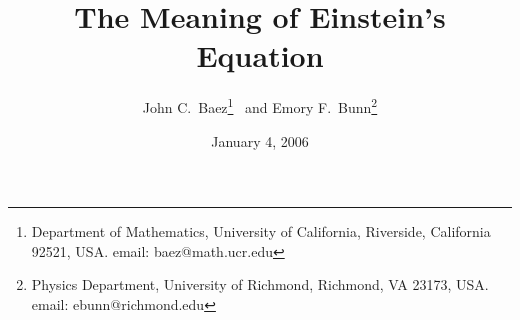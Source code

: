  

\hfuzz=6pt

\newcommand{\et}{\hspace{-0.08in}{\bf .}\hspace{0.1in}}
\newcommand{\BOX}{\hbox {$\sqcap$ \kern -1em $\sqcup$}}
\newcommand{\qed}{\hskip 3em \hbox{\BOX} \vskip 2ex}

\newenvironment{alphalist}{
\begin{list}{{\normalshape(\alph{letter})}}{\usecounter{letter}}
}{\end{list}}

%
%
%
\documentclass[12pt] {article} 
\usepackage {amsfonts}

\usepackage[colorlinks=true
,breaklinks=true
,urlcolor=blue
,anchorcolor=blue
,citecolor=blue
,filecolor=blue
,linkcolor=blue
,menucolor=blue
,linktocpage=true]{hyperref}
\hypersetup{
bookmarksopen=true,
bookmarksnumbered=true,
bookmarksopenlevel=10
}
\usepackage[utf8]{inputenc}
\usepackage[T1]{fontenc}
\usepackage[largesc]{newpxtext}
\usepackage[smallerops]{newpxmath}
\usepackage[cal=cm]{mathalfa}
\usepackage[papersize={6.9in, 10.0in}, left=.5in, right=.5in, top=1in, bottom=.9in]{geometry}
\linespread{1.05}
\sloppy
\raggedbottom
\pagestyle{plain}




\usepackage[small]{titlesec}
\usepackage{cite}

\setcounter{tocdepth}{3}




\title{The Meaning of Einstein's Equation}
\author{John C.\ Baez\footnote{
      Department of Mathematics, University of California,
      Riverside, California 92521, USA.
      email: baez@math.ucr.edu}
      \ and Emory F.\ Bunn\footnote{
      Physics Department, University of Richmond, Richmond, VA 23173, USA.
      email: ebunn@richmond.edu}}
\date{January 4, 2006}
\maketitle

